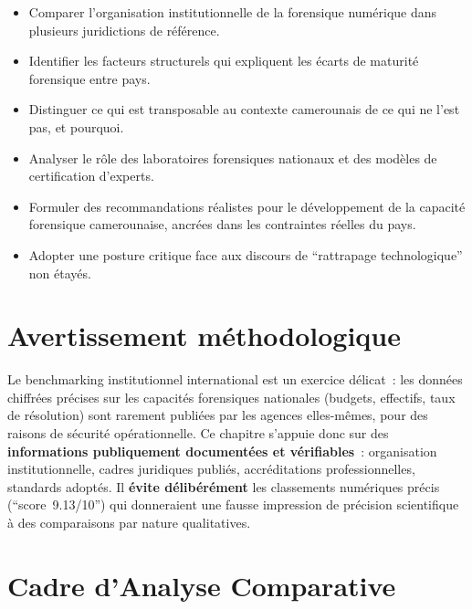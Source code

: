 \begin{boxobjectifs}
\begin{itemize}
    \item Comparer l'organisation institutionnelle de la forensique
          numérique dans plusieurs juridictions de référence.
    \item Identifier les facteurs structurels qui expliquent les
          écarts de maturité forensique entre pays.
    \item Distinguer ce qui est transposable au contexte camerounais
          de ce qui ne l'est pas, et pourquoi.
    \item Analyser le rôle des laboratoires forensiques nationaux
          et des modèles de certification d'experts.
    \item Formuler des recommandations réalistes pour le développement
          de la capacité forensique camerounaise, ancrées dans
          les contraintes réelles du pays.
    \item Adopter une posture critique face aux discours de
          ``rattrapage technologique'' non étayés.
\end{itemize}
\end{boxobjectifs}

\bigskip

\section*{Avertissement méthodologique}

Le benchmarking institutionnel international est un exercice délicat~:
les données chiffrées précises sur les capacités forensiques nationales
(budgets, effectifs, taux de résolution) sont rarement publiées par les
agences elles-mêmes, pour des raisons de sécurité opérationnelle.
Ce chapitre s'appuie donc sur des \textbf{informations publiquement
documentées et vérifiables}~: organisation institutionnelle, cadres
juridiques publiés, accréditations professionnelles, standards
adoptés. Il \textbf{évite délibérément} les classements numériques
précis (``score~9.13/10'') qui donneraient une fausse impression
de précision scientifique à des comparaisons par nature qualitatives.

\separateur

\section{Cadre d'Analyse Comparative}
\label{sec:cadre-analyse}

